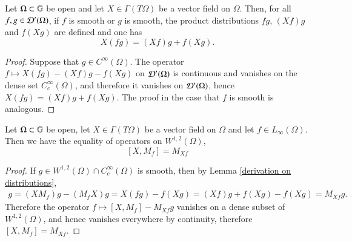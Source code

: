 \documentclass[leqno]{amsart}
\begin{document}
	\begin{lemma}\label{derivation on distributions}
		Let $\Omega\subset\mathbb{G}$ be open and let $X\in\Gamma(T\Omega)$ be a vector field on $\Omega$. Then, for all $f,g\in {\mathcal D}'(\Omega)$, if $f$ is smooth or $g$ is smooth, the product distributions $fg$, $(Xf)g$ and $f(Xg)$ are defined and one has
		$$X(fg)=(Xf)g+f(Xg).$$
	\end{lemma}
	\begin{proof}
		Suppose that $g\in C^\infty(\Omega)$. The operator $f\mapsto X(fg)-(Xf)g-f(Xg)$ on ${\mathcal D}'(\Omega)$ is continuous and vanishes on the dense set $C_c^\infty(\Omega)$, and therefore it vanishes on ${\mathcal D}'(\Omega)$, hence $X(fg)=(Xf)g+f(Xg)$. The proof in the case that $f$ is smooth is analogous.
	\end{proof}
	
	\begin{lemma}\label{vector field multiplier commutator}
		Let $\Omega\subset\mathbb{G}$ be open, let $X\in\Gamma(T\Omega)$ be a vector field on $\Omega$ and let $f\in L_\infty(\Omega)$. Then we have the equality of operators on $W^{1,2}(\Omega)$,
		$$[X, M_f]=M_{Xf}$$
	\end{lemma}
	\begin{proof}
		If $g\in W^{1,2}(\Omega)\cap C^\infty_c(\Omega)$ is smooth, then by Lemma \ref{derivation on distributions},
		\begin{align*}
			[X, M_f]g=(XM_f)g-(M_fX)g=X(fg)-f(Xg)=(Xf)g+f(Xg)-f(Xg)=M_{Xf}g.
		\end{align*}
		Therefore the operator $f\mapsto [X, M_f]-M_{Xf}g$ vanishes on a dense subset of $W^{1,2}(\Omega)$, and hence vanishes everywhere by continuity, therefore $[X, M_f]=M_{Xf}$.
	\end{proof}
	
\end{document}
